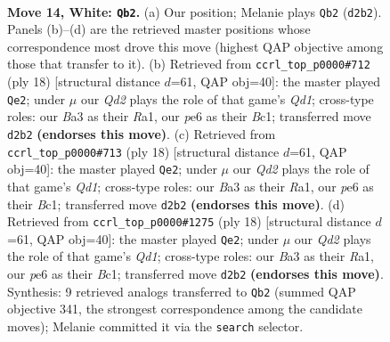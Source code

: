 \documentclass[11pt]{article}
\begin{document}
\clearpage

\begin{figure}[p]\centering
\begin{subfigure}{0.46\textwidth}\centering
\resizebox{\linewidth}{!}{%
\newchessgame
\chessboard[
  setfen={rnbqr1k1/1p3p2/4pnp1/p6p/3P4/B1P2N2/P2QBPPP/R4RK1 w - - 0 14},
  showmover=false,
  pgfstyle=straightmove, color=movearrow, markmove={d2-b2}
]}
\caption{}
\end{subfigure}\hfill
\begin{subfigure}{0.46\textwidth}\centering
\resizebox{\linewidth}{!}{%
\newchessgame
\chessboard[
  setfen={rnbq1rk1/p4ppp/1p2pn2/8/1bBP4/2N2N2/PP3PPP/R1BQ1RK1 w - - 0 10},
  showmover=false,
  pgfstyle=straightmove, color=movearrow, markmove={d1-e2}
]}
\caption{}
\end{subfigure}
\\[4pt]
\begin{subfigure}{0.46\textwidth}\centering
\resizebox{\linewidth}{!}{%
\newchessgame
\chessboard[
  setfen={rnbq1rk1/p4ppp/1p2pn2/8/1bBP4/2N2N2/PP3PPP/R1BQ1RK1 w - - 0 10},
  showmover=false,
  pgfstyle=straightmove, color=movearrow, markmove={d1-e2}
]}
\caption{}
\end{subfigure}\hfill
\begin{subfigure}{0.46\textwidth}\centering
\resizebox{\linewidth}{!}{%
\newchessgame
\chessboard[
  setfen={rnbq1rk1/p4ppp/1p2pn2/8/1bBP4/2N2N2/PP3PPP/R1BQ1RK1 w - - 0 10},
  showmover=false,
  pgfstyle=straightmove, color=movearrow, markmove={d1-e2}
]}
\caption{}
\end{subfigure}
\caption{\textbf{Move 14, White: \texttt{Qb2}.} (a) Our position; Melanie plays \texttt{Qb2} (\texttt{d2b2}). Panels (b)--(d) are the retrieved master positions whose correspondence most drove this move (highest QAP objective among those that transfer to it). (b) Retrieved from \texttt{ccrl\_top\_p0000\#712} (ply 18) [structural distance $d$=61, QAP obj=40]: the master played \texttt{Qe2}; under $\mu$ our \emph{Qd2} plays the role of that game's \emph{Qd1}; cross-type roles: our \emph{B}a3 as their \emph{R}a1, our \emph{p}e6 as their \emph{B}c1; transferred move \texttt{d2b2} \textbf{(endorses this move)}. (c) Retrieved from \texttt{ccrl\_top\_p0000\#713} (ply 18) [structural distance $d$=61, QAP obj=40]: the master played \texttt{Qe2}; under $\mu$ our \emph{Qd2} plays the role of that game's \emph{Qd1}; cross-type roles: our \emph{B}a3 as their \emph{R}a1, our \emph{p}e6 as their \emph{B}c1; transferred move \texttt{d2b2} \textbf{(endorses this move)}. (d) Retrieved from \texttt{ccrl\_top\_p0000\#1275} (ply 18) [structural distance $d$=61, QAP obj=40]: the master played \texttt{Qe2}; under $\mu$ our \emph{Qd2} plays the role of that game's \emph{Qd1}; cross-type roles: our \emph{B}a3 as their \emph{R}a1, our \emph{p}e6 as their \emph{B}c1; transferred move \texttt{d2b2} \textbf{(endorses this move)}. Synthesis: 9 retrieved analogs transferred to \texttt{Qb2} (summed QAP objective 341, the strongest correspondence among the candidate moves); Melanie committed it via the \texttt{search} selector.}
\label{fig:thought-m26}
\end{figure}
\end{document}
